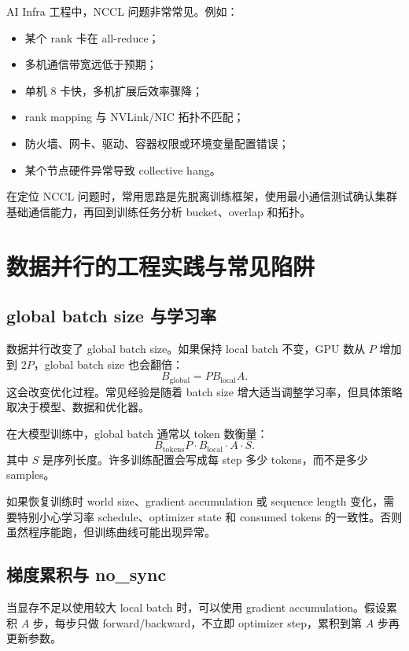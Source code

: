 AI Infra 工程中，NCCL 问题非常常见。例如：

\begin{itemize}
\item 某个 rank 卡在 all-reduce；
\item 多机通信带宽远低于预期；
\item 单机 8 卡快，多机扩展后效率骤降；
\item rank mapping 与 NVLink/NIC 拓扑不匹配；
\item 防火墙、网卡、驱动、容器权限或环境变量配置错误；
\item 某个节点硬件异常导致 collective hang。
\end{itemize}

在定位 NCCL 问题时，常用思路是先脱离训练框架，使用最小通信测试确认集群基础通信能力，再回到训练任务分析 bucket、overlap 和拓扑。

\section{数据并行的工程实践与常见陷阱}
\label{sec:data-parallel-engineering-practices}

\subsection{global batch size 与学习率}
\label{subsec:global-batch-size-and-lr}

数据并行改变了 global batch size。如果保持 local batch 不变，GPU 数从 $P$ 增加到 $2P$，global batch size 也会翻倍：
\[
B_{\mathrm{global}}=P B_{\mathrm{local}} A.
\]
这会改变优化过程。常见经验是随着 batch size 增大适当调整学习率，但具体策略取决于模型、数据和优化器。

在大模型训练中，global batch 通常以 token 数衡量：
\[
B_{\mathrm{tokens}}
P\cdot B_{\mathrm{local}}\cdot A\cdot S.
\]
其中 $S$ 是序列长度。许多训练配置会写成每 step 多少 tokens，而不是多少 samples。

如果恢复训练时 world size、gradient accumulation 或 sequence length 变化，需要特别小心学习率 schedule、optimizer state 和 consumed tokens 的一致性。否则虽然程序能跑，但训练曲线可能出现异常。

\subsection{梯度累积与 no_sync}
\label{subsec:gradient-accumulation-no-sync}

当显存不足以使用较大 local batch 时，可以使用 gradient accumulation。假设累积 $A$ 步，每步只做 forward/backward，不立即 optimizer step，累积到第 $A$ 步再更新参数。

